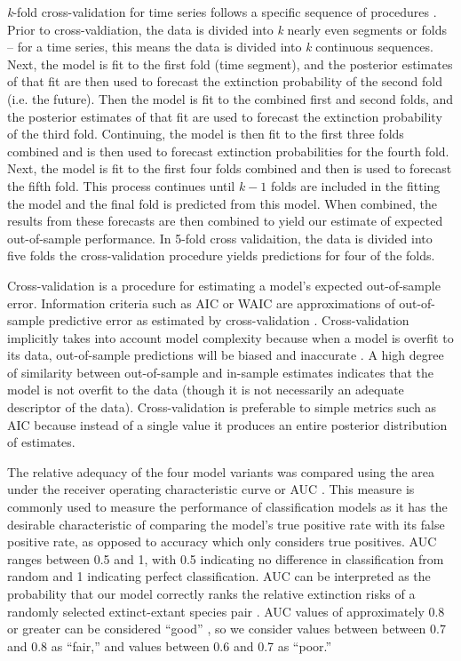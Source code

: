 \documentclass[12pt,letterpaper]{article}
\begin{document}
\begin{refsection}
\textit{k}-fold cross-validation for time series follows a specific sequence of procedures \citep{Arlot2010,Bergmeir2016,ESL}. Prior to cross-valdiation, the data is divided into \textit{k} nearly even segments or folds -- for a time series, this means the data is divided into \textit{k} continuous sequences. Next, the model is fit to the first fold (time segment), and the posterior estimates of that fit are then used to forecast the extinction probability of the second fold (i.e. the future). Then the model is fit to the combined first and second folds, and the posterior estimates of that fit are used to forecast the extinction probability of the third fold. Continuing, the model is then fit to the first three folds combined and is then used to forecast extinction probabilities for the fourth fold. Next, the model is fit to the first four folds combined and then is used to forecast the fifth fold. This process continues until $k - 1$ folds are included in the fitting the model and the final fold is predicted from this model. When combined, the results from these forecasts are then combined to yield our estimate of expected out-of-sample performance. In 5-fold cross validaition, the data is divided into five folds the cross-validation procedure yields predictions for four of the folds.

Cross-validation is a procedure for estimating a model's expected out-of-sample error. Information criteria such as AIC or WAIC are approximations of out-of-sample predictive error as estimated by cross-validation \citep{ESL,Gelman2013d}. Cross-validation implicitly takes into account model complexity because when a model is overfit to its data, out-of-sample predictions will be biased and inaccurate \citep{ESL}. A high degree of similarity between out-of-sample and in-sample estimates indicates that the model is not overfit to the data (though it is not necessarily an adequate descriptor of the data). Cross-validation is preferable to simple metrics such as AIC because instead of a single value it produces an entire posterior distribution of estimates.

The relative adequacy of the four model variants was compared using the area under the receiver operating characteristic curve or AUC \citep{Fawcett2006,Mason2002}. This measure is commonly used to measure the performance of classification models as it has the desirable characteristic of comparing the model's true positive rate with its false positive rate, as opposed to accuracy which only considers true positives. AUC ranges between 0.5 and 1, with 0.5 indicating no difference in classification from random and 1 indicating perfect classification. AUC can be interpreted as the probability that our model correctly ranks the relative extinction risks of a randomly selected extinct-extant species pair \citep{Fawcett2006,Mason2002}. AUC values of approximately 0.8 or greater can be considered ``good'' \citep{ACCDA}, so we consider values between between 0.7 and 0.8 as ``fair,'' and values between 0.6 and 0.7 as ``poor.''


\end{refsection}
\end{document}

